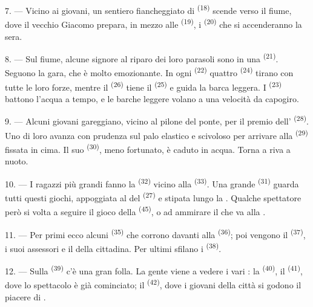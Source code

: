 7. --- Vicino ai giovani, un sentiero fiancheggiato di 
\textsuperscript{(18)} scende verso il fiume, dove il vecchio Giacomo prepara, in
mezzo alle  \textsuperscript{(19)}, i 
\textsuperscript{(20)} che si accenderanno la sera.

\VUsaut{4.4mm}
\VUsaut{3.4mm}

8. --- Sul fiume, alcune signore al riparo dei loro parasoli sono in una  \textsuperscript{(21)}. Seguono la gara, che è molto emozionante. In ogni
 \textsuperscript{(22)} quattro  \textsuperscript{(24)}
tirano con tutte le loro forze, mentre il  \textsuperscript{(26)}
tiene il  \textsuperscript{(25)} e guida la barca leggera. I
 \textsuperscript{(23)} battono l'acqua a tempo, e le barche leggere
volano a una velocità da capogiro.

9. --- Alcuni giovani gareggiano, vicino al pilone del ponte, per il premio
dell' \textsuperscript{(28)}. Uno di loro avanza con
prudenza sul palo elastico e scivoloso per arrivare alla 
\textsuperscript{(29)} fissata in cima. Il suo  \textsuperscript{(30)},
meno fortunato, è caduto in acqua. Torna a riva a nuoto.

10. --- I ragazzi più grandi fanno la 
\textsuperscript{(32)} vicino alla  \textsuperscript{(33)}. Una
grande  \textsuperscript{(31)} guarda tutti questi giochi, appoggiata al
 del  \textsuperscript{(27)} e stipata lungo la
. Qualche spettatore però si volta a seguire il gioco della
 \textsuperscript{(45)}, o ad ammirare il 
che va alla .

11. --- Per primi ecco alcuni  \textsuperscript{(35)} che corrono
davanti alla  \textsuperscript{(36)}; poi vengono il 
\textsuperscript{(37)}, i suoi assessori e il  della
cittadina. Per ultimi sfilano i  \textsuperscript{(38)}.

\VUsaut{5.0mm}
\VUsaut{3.6mm}

12. --- Sulla  \textsuperscript{(39)} c'è una gran folla. La
gente viene a vedere i vari : la 
\textsuperscript{(40)}, il  \textsuperscript{(41)}, dove lo spettacolo è
già cominciato; il  \textsuperscript{(42)}, dove i giovani della
città si godono il piacere di .

